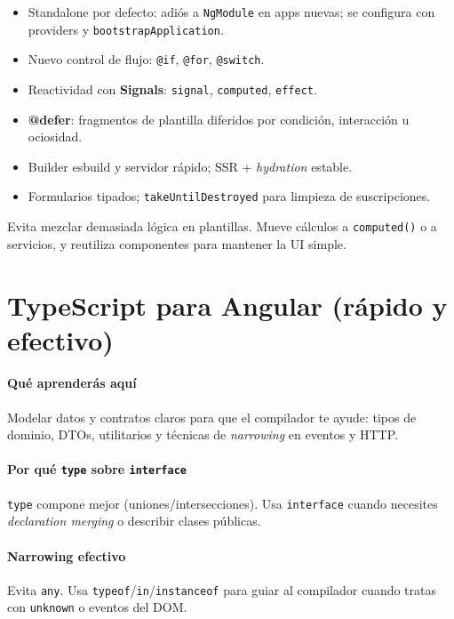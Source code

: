\documentclass[11pt,a4paper]{article}
\begin{document}
\begin{itemize}[leftmargin=*]
  \item Standalone por defecto: adiós a \texttt{NgModule} en apps nuevas; se configura con providers y \texttt{bootstrapApplication}.
  \item Nuevo control de flujo: \texttt{@if}, \texttt{@for}, \texttt{@switch}.
  \item Reactividad con \textbf{Signals}: \texttt{signal}, \texttt{computed}, \texttt{effect}.
  \item \textbf{@defer}: fragmentos de plantilla diferidos por condición, interacción u ociosidad.
  \item Builder esbuild y servidor rápido; SSR + \emph{hydration} estable.
  \item Formularios tipados; \texttt{takeUntilDestroyed} para limpieza de suscripciones.
\end{itemize}

\begin{warnbox}
Evita mezclar demasiada lógica en plantillas. Mueve cálculos a \texttt{computed()} o a servicios, y reutiliza componentes para mantener la UI simple.
\end{warnbox}

\section{TypeScript para Angular (rápido y efectivo)}
\paragraph{Qué aprenderás aquí}
Modelar datos y contratos claros para que el compilador te ayude: tipos de dominio, DTOs, utilitarios y técnicas de \emph{narrowing} en eventos y HTTP.

\paragraph{Por qué \texttt{type} sobre \texttt{interface}}
\texttt{type} compone mejor (uniones/intersecciones). Usa \texttt{interface} cuando necesites \emph{declaration merging} o describir clases públicas.

\paragraph{Narrowing efectivo}
Evita \texttt{any}. Usa \texttt{typeof}/\texttt{in}/\texttt{instanceof} para guiar al compilador cuando tratas con \texttt{unknown} o eventos del DOM.
\end{document}
